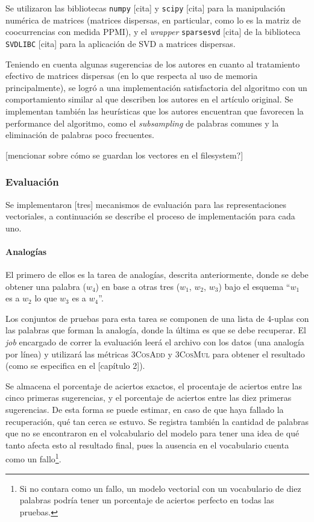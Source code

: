 Se utilizaron las bibliotecas \texttt{numpy} [cita] y \texttt{scipy} [cita] para la manipulación
numérica de matrices (matrices dispersas, en particular, como lo es la matriz de coocurrencias con
medida PPMI), y el \textit{wrapper} \texttt{sparsesvd} [cita] de la biblioteca \texttt{SVDLIBC}
[cita] para la aplicación de SVD a matrices dispersas.

Teniendo en cuenta algunas sugerencias de los autores en cuanto al tratamiento efectivo de matrices
dispersas (en lo que respecta al uso de memoria principalmente), se logró a una implementación
satisfactoria del algoritmo con un comportamiento similar al que describen los autores en el
artículo original. Se implementan también las heurísticas que los autores encuentran que favorecen
la performance del algoritmo, como el \textit{subsampling} de palabras comunes y la eliminación de
palabras poco frecuentes.

[mencionar sobre cómo se guardan los vectores en el filesystem?]


\subsubsection{Evaluación}

Se implementaron [tres] mecanismos de evaluación para las representaciones vectoriales, a
continuación se describe el proceso de implementación para cada uno.


\paragraph{Analogías}

El primero de ellos es la tarea de analogías, descrita anteriormente, donde se debe obtener una
palabra ($w_4$) en base a otras tres ($w_1$, $w_2$, $w_3$) bajo el esquema ``$w_1$ es a $w_2$ lo que
$w_3$ es a $w_4$''.

Los conjuntos de pruebas para esta tarea se componen de una lista de 4-uplas con las palabras que
forman la analogía, donde la última es que se debe recuperar. El \textit{job} encargado de correr la
evaluación leerá el archivo con los datos (una analogía por línea) y utilizará las métricas
\textsc{3CosAdd} y \textsc{3CosMul} para obtener el resultado (como se especifica en el [capítulo
2]).

Se almacena el porcentaje de aciertos exactos, el procentaje de aciertos entre las cinco primeras
sugerencias, y el porcentaje de aciertos entre las diez primeras sugerencias. De esta forma se puede
estimar, en caso de que haya fallado la recuperación, qué tan cerca se estuvo. Se registra también
la cantidad de palabras que no se encontraron en el volcabulario del modelo para tener una idea de
qué tanto afecta esto al resultado final, pues la ausencia en el vocabulario cuenta como un
fallo\footnote{Si no contara como un fallo, un modelo vectorial con un vocabulario de diez palabras
podría tener un porcentaje de aciertos perfecto en todas las pruebas.}.


